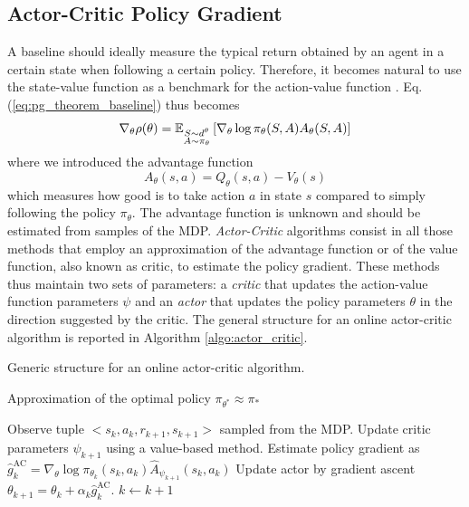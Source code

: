 \subsection{Actor-Critic Policy Gradient}
A baseline should ideally measure the typical return obtained by an agent in a certain state when following a certain policy. Therefore, it becomes natural to use the state-value function as a benchmark for the action-value function \cite{grondman2012survey}. Eq. (\ref{eq:pg_theorem_baseline}) thus becomes
\begin{equation}
\label{eq:actor_critic_pg}
	\nabla_\theta \rho(\theta) =
		\E[\substack{S \sim d^\theta\\A \sim \pi_\theta}]{\nabla_\theta\log
		\pi_\theta(S,A) A_\theta(S,A)}
\end{equation} 
where we introduced the advantage function
\begin{equation}
	A_\theta(s,a) = Q_\theta(s,a) - V_\theta(s)
\end{equation}
which measures how good is to take action $a$ in state $s$ compared to simply following the policy $\pi_\theta$. The advantage function is unknown and should be estimated from samples of the \gls{MDP}. \emph{Actor-Critic} algorithms consist in all those methods that employ an approximation of the advantage function or of the value function, also known as critic, to estimate the policy gradient. These methods thus maintain two sets of parameters: a \emph{critic} that updates the action-value function parameters $\psi$ and an \emph{actor} that updates the policy parameters $\theta$ in the direction suggested by the critic. The general structure for an online actor-critic algorithm is reported in Algorithm \ref{algo:actor_critic}.\\
\begin{algorithm}[t]
	\caption{Generic structure for an online actor-critic algorithm.}
	\label{algo:actor_critic}
	\begin{algorithmic}[0]
		\Ensure Approximation of the optimal policy $\pi_{\theta^*} \approx \pi_*$
		\begin{algorithmic}[1]
		\Repeat
			\State Observe tuple $<s_k, a_k, r_{k+1}, s_{k+1}>$ sampled from the MDP.
			\State Update critic parameters $\psi_{k+1}$ using a value-based method. 
			\State Estimate policy gradient as $\widehat{g}_k^\text{AC} = \nabla_\theta \log \pi_{\theta_k}(s_k, a_k) \widehat{A}_{\psi_{k+1}}(s_k, a_k)$
			\State Update actor by gradient ascent $\theta_{k+1} = \theta_k + \alpha_k \widehat{g}_k^\text{AC}$. 
			\State $k \leftarrow k + 1$
		\end{algorithmic}
	\end{algorithmic}
\end{algorithm}
